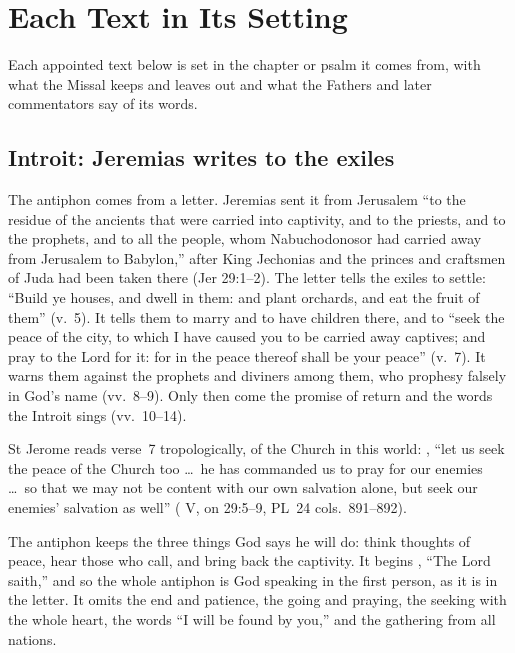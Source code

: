 \section{Each Text in Its Setting}
\label{sec:each-element}

Each appointed text below is set in the chapter or psalm it comes from, with
what the Missal keeps and leaves out and what the Fathers and later
commentators say of its words.

\subsection{Introit: Jeremias writes to the exiles}
\label{sec:element-introit}

The antiphon comes from a letter. Jeremias sent it from Jerusalem ``to the
residue of the ancients that were carried into captivity, and to the priests,
and to the prophets, and to all the people, whom Nabuchodonosor had carried
away from Jerusalem to Babylon,'' after King Jechonias and the princes and
craftsmen of Juda had been taken there (Jer 29:1--2). The letter tells the
exiles to settle: ``Build ye houses, and dwell in them: and plant orchards,
and eat the fruit of them'' (v.~5). It tells them to marry and to have
children there, and to ``seek the peace of the city, to which I have caused
you to be carried away captives; and pray to the Lord for it: for in the peace
thereof shall be your peace'' (v.~7). It warns them against the prophets and
diviners among them, who prophesy falsely in God's name (vv.~8--9). Only then
come the promise of return and the words the Introit sings (vv.~10--14).

St Jerome reads verse~7 tropologically, of the Church in this world:
, ``let us seek the peace of the Church too \dots\ he
has commanded us to pray for our enemies \dots\ so that we may not be content
with our own salvation alone, but seek our enemies' salvation as well''
( V, on 29:5--9, PL~24 cols.~891--892).

The antiphon keeps the three things God says he will do: think thoughts of
peace, hear those who call, and bring back the captivity. It begins
, ``The Lord saith,'' and so the whole antiphon is God
speaking in the first person, as it is in the letter. It omits the end and
patience, the going and praying, the seeking with the whole heart, the words
``I will be found by you,'' and the gathering from all nations.

